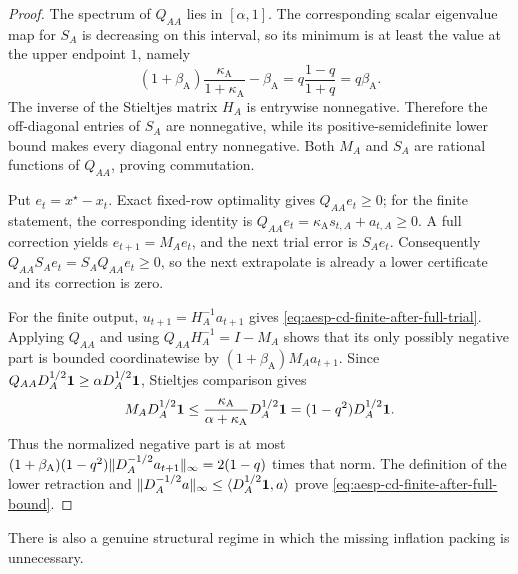 \begin{proof}
The spectrum of $Q_{AA}$ lies in $[\alpha,1]$.  The corresponding scalar
eigenvalue map for $S_A$ is decreasing on this interval, so its minimum is
at least the value at the upper endpoint $1$, namely
\begin{equation*}
 (1+\beta_{\mathrm A})
 \frac{\kappa_{\mathrm A}}{1+\kappa_{\mathrm A}}
 -\beta_{\mathrm A}
 =q\frac{1-q}{1+q}=q\beta_{\mathrm A}.
\end{equation*}
The inverse of the Stieltjes matrix $H_A$ is entrywise nonnegative.
Therefore the off-diagonal entries of $S_A$ are nonnegative, while its
positive-semidefinite lower bound makes every diagonal entry nonnegative.
Both $M_A$ and $S_A$ are rational functions of $Q_{AA}$, proving
commutation.

Put $e_t=x^\star-x_t$.  Exact fixed-row optimality gives
$Q_{AA}e_t\geq0$; for the finite statement, the corresponding identity is
$Q_{AA}e_t=\kappa_{\mathrm A}s_{t,A}+a_{t,A}\geq0$.  A full correction yields
$e_{t+1}=M_Ae_t$, and the next trial error is $S_Ae_t$.  Consequently
$Q_{AA}S_Ae_t=S_AQ_{AA}e_t\geq0$, so the next extrapolate is already a
lower certificate and its correction is zero.

For the finite output, $u_{t+1}=H_A^{-1}a_{t+1}$ gives
\cref{eq:aesp-cd-finite-after-full-trial}.  Applying $Q_{AA}$ and using
$Q_{AA}H_A^{-1}=I-M_A$ shows that its only possibly negative part is bounded
coordinatewise by
$(1+\beta_{\mathrm A})M_Aa_{t+1}$.  Since
$Q_{AA}D_A^{1/2}\mathbf{1}\geq\alpha D_A^{1/2}\mathbf{1}$, Stieltjes comparison gives
\begin{equation*}
 M_AD_A^{1/2}\mathbf{1}
 \leq\frac{\kappa_{\mathrm A}}
              {\alpha+\kappa_{\mathrm A}}D_A^{1/2}\mathbf{1}
 =(1-q^2)D_A^{1/2}\mathbf{1}.
\end{equation*}
Thus the normalized negative part is at most
$(1+\beta_{\mathrm A})(1-q^2)
\lVert D_A^{-1/2}a_{t+1}\rVert_\infty=2(1-q)$ times that norm.
The definition of the lower retraction and
$\lVert D_A^{-1/2}a\rVert_{\infty}\leq\langle D_A^{1/2}\mathbf{1},a\rangle$
prove \cref{eq:aesp-cd-finite-after-full-bound}.
\end{proof}

There is also a genuine structural regime in which the missing inflation
packing is unnecessary.

